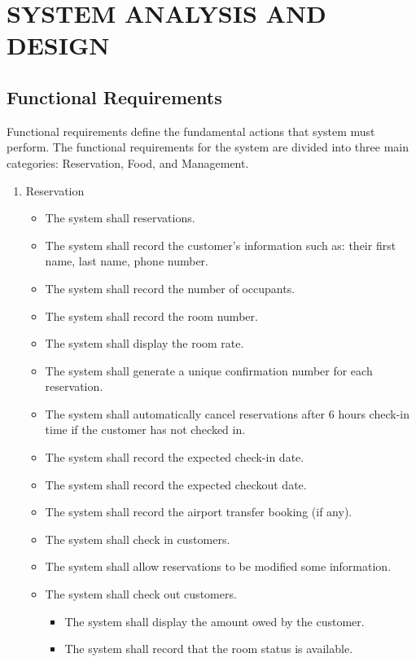 \chapter{SYSTEM ANALYSIS AND DESIGN}
    \section{Functional Requirements}
    Functional requirements define the fundamental actions that system must perform. The functional requirements for the system are divided into three main categories: Reservation, Food, and Management. 
    \begin{enumerate}
        \item Reservation
        \begin{itemize}
            \item The system shall reservations.
            \item The system shall record the customer's information such as: their first name, last name, phone number.
            \item The system shall record the number of occupants.
            \item The system shall record the room number.
            \item The system shall display the room rate.
            \item The system shall generate a unique confirmation number for each reservation.
            \item The system shall automatically cancel reservations after 6 hours check-in time if the customer has not checked in.
            \item The system shall record the expected check-in date.
            \item The system shall record the expected checkout date.
            \item The system shall record the airport transfer booking (if any).
            \item The system shall check in customers.
            \item The system shall allow reservations to be modified some information.
            \item The system shall check out customers.
            \begin{itemize}
                \item The system shall display the amount owed by the customer.
                \item The system shall record that the room status is available.

\end{itemize}
\end{itemize}
\end{enumerate}
